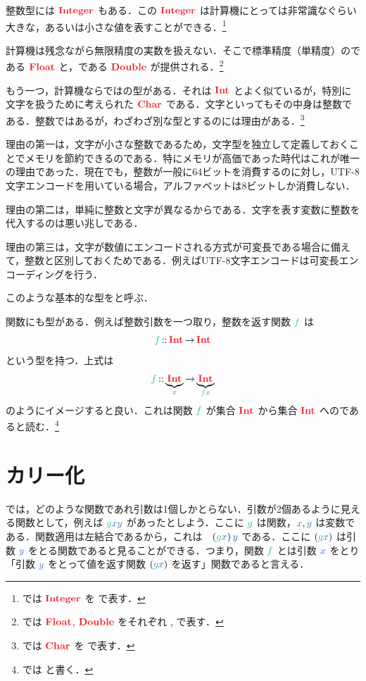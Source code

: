 \documentclass[a5paper,twoside,fleqn,draft]{jsbook}
\begin{document}
整数型には $\hInteger$ もある．この $\hInteger$ は計算機にとっては非常識なぐらい大きな，あるいは小さな値を表すことができる．\footnote{\haskell では $\hInteger$ を  で表す．}

計算機は残念ながら無限精度の実数を扱えない．そこで標準精度（単精度）のである $\hFloat$ と，である $\hDouble$ が提供される．\footnote{\haskell では $\hFloat$, $\hDouble$ をそれぞれ ,  で表す．}

もう一つ，計算機ならではの型がある．それは $\hInt$ とよく似ているが，特別に文字を扱うために考えられた $\hChar$ である．文字といってもその中身は整数である．整数ではあるが，わざわざ別な型とするのには理由がある．\footnote{\haskell では $\hChar$ を  で表す．}

理由の第一は，文字が小さな整数であるため，文字型を独立して定義しておくことでメモリを節約できるのである．特にメモリが高価であった時代はこれが唯一の理由であった．現在でも，整数が一般に64ビットを消費するのに対し，UTF-8文字エンコードを用いている場合，アルファベットは8ビットしか消費しない．

理由の第二は，単純に整数と文字が異なるからである．文字を表す変数に整数を代入するのは悪い兆しである．

理由の第三は，文字が数値にエンコードされる方式が可変長である場合に備えて，整数と区別しておくためである．例えばUTF-8文字エンコードは可変長エンコーディングを行う．

このような基本的な型をと呼ぶ．

\separator

関数にも型がある．例えば整数引数を一つ取り，整数を返す関数 $\hFunc{f}$ は
\begin{equation}
  \hFunc{f}
  \hIsTypeOf\hInt
  \hFunctionArrow\hInt
\end{equation}
という型を持つ．上式は
\begin{equation}
  \hFunc{f}
  \hIsTypeOf\underbrace{\hInt}_{\hVar{x}}
  \hFunctionArrow\underbrace{\hInt}_{\hFunc{f}\hVar{x}}
\end{equation}
のようにイメージすると良い．これは関数 $\hFunc{f}$ が集合 $\hInt$ から集合 $\hInt$ へのであると読む．\footnote{\haskell では  と書く．}

\section{カリー化}

\haskell では，どのような関数であれ引数は1個しかとらない．引数が2個あるように見える関数として，例えば $\hFunc{g}\hVar{x}\hVar{y}$ があったとしよう．ここに $\hFunc{g}$ は関数，$\hVar{x},\hVar{y}$ は変数である．関数適用は左結合であるから，これは　$\left(\hFunc{g}\hVar{x}\right)\hVar{y}$ である．ここに $\left(\hFunc{g}\hVar{x}\right)$ は引数 $\hVar{y}$ をとる関数であると見ることができる．つまり，関数 $\hFunc{f}$ とは引数 $\hVar{x}$ をとり「引数 $\hVar{y}$ をとって値を返す関数 $\left(\hFunc{g}\hVar{x}\right)$ を返す」関数であると言える．
\end{document}
